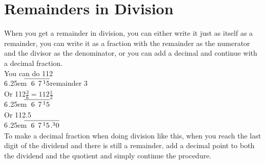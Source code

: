 \documentclass{article}
\newcommand\mylongdiv[2]{%
$\strut#1$\kern.25em\smash{\raise.3ex\hbox{$\big)$}}$\mkern-8mu
        \overline{\quad\strut#2}$}
\begin{document}
\section{Remainders in Division}
When you get a remainder in division, you can either write it just as itself as a remainder, you can write it as a fraction with the remainder as the numerator and the divisor as the denominator, or you can add a decimal and continue with a decimal fraction.\\

You can do
\hspace*{4.1ex}1\hspace{1.3ex}1\hspace{0.9ex}2\\
\hspace*{7em}\mylongdiv{6}{6\hspace{1.1ex}7\hspace{0.4ex}{^1}5}\hspace{1em}remainder 3\\

Or
\hspace*{12.1ex}1\hspace{1.2ex}1\hspace{1.1ex}2\hspace{1ex}$\frac{3}{6} = 112 \frac{1}{2}$\\
\hspace*{7em}\mylongdiv{6}{6\hspace{1.1ex}7\hspace{0.4ex}{^1}5}\\

Or
\hspace*{12.1ex}1\hspace{1.3ex}1\hspace{0.9ex}2\hspace{0.7ex}.\hspace{0.8ex}5\\
\hspace*{7em}\mylongdiv{6}{6\hspace{1.1ex}7\hspace{0.4ex}{^1}5\hspace{0.3ex}.^30}\\

To make a decimal fraction when doing division like this, when you reach the last digit of the dividend and there is still a remainder, add a decimal point to both the dividend and the quotient and simply continue the procedure.\\
\end{document}
